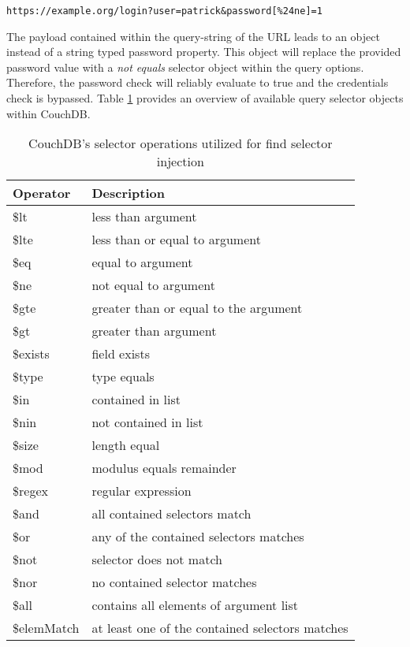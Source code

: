 \begin{lstlisting}[caption={Attack vector against CouchDB for speical key injection via the query-string parameter}, label={lst:FindSelectorInjectionAttack}]
https://example.org/login?user=patrick&password[%24ne]=1
\end{lstlisting}

The payload contained within the query-string of the URL leads to an object instead of a string typed password property. This object will replace the provided password value with a \emph{not equals} selector object within the query options. Therefore, the password check will reliably evaluate to true and the credentials check is bypassed. Table \ref{tab:couchdb_affected_selectors} provides an overview of available query selector objects within CouchDB. \\

\begin{table}[h]
 \sffamily
 \centering
 \begin{tabular}{ll}
  \textbf{Operator} & \textbf{Description} \\ \hline
  \$lt      & less than argument\\
  \$lte     & less than or equal to argument \\
  \$eq      & equal to argument \\
  \$ne      & not equal to argument \\
  \$gte     & greater than or equal to the argument \\
  \$gt      & greater than argument \\
  \$exists  & field exists \\
  \$type    & type equals \\
  \$in      & contained in list \\
  \$nin     & not contained in list \\
  \$size    & length equal \\
  \$mod     & modulus equals remainder \\
  \$regex   & regular expression \\
  \$and     & all contained selectors match \\
  \$or      & any of the contained selectors matches \\
  \$not     & selector does not match \\
  \$nor     & no contained selector matches \\
  \$all     & contains all elements of argument list \\ 
  \$elemMatch & at least one of the contained selectors matches \\
  \bottomrule 
 \end{tabular}
 \caption{CouchDB's selector operations utilized for find selector injection}
 \label{tab:couchdb_affected_selectors}
\end{table}

